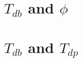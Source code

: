 \documentclass{book}
\begin{document}
\chapter{\(T_{db}\) and \(\phi\) }


\newpage
{
\small



}


\chapter{  \(T_{db}\) and \(T_{dp}\) }

\newpage
{
\small




}






\end{document}
